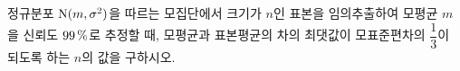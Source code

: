 정규분포 $\mathrm{N}(m{,}\mkern3mu\mathopen{}\sigma^2)$을 따르는 모집단에서 크기가 $n$인 표본을 임의추출하여 모평균 $m$을 신뢰도 $99\mkern3mu \%$로 추정할 때, 모평균과 표본평균의 차의 최댓값이 모표준편차의 $\dfrac{1}{3}$이 되도록 하는 $n$의 값을 구하시오. 
